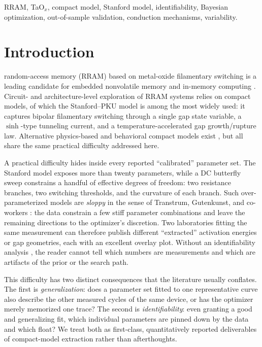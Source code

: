 \documentclass[journal]{IEEEtran}
\begin{document}
\begin{IEEEkeywords}
RRAM, TaO$_x$, compact model, Stanford model, identifiability, Bayesian
optimization, out-of-sample validation, conduction mechanisms, variability.
\end{IEEEkeywords}

\IEEEpeerreviewmaketitle

\section{Introduction}

 random-access memory (RRAM) based on metal-oxide
filamentary switching is a leading candidate for embedded nonvolatile memory
and in-memory computing \cite{wong2012metal,ielmini2018inmemory,yu2018neuro}.
Circuit- and architecture-level exploration of RRAM systems relies on
compact models, of which the Stanford--PKU model
\cite{guan2012spice,jiang2016verification} is among the most widely used: it
captures bipolar filamentary switching through a single gap state variable, a
$\sinh$-type tunneling current, and a temperature-accelerated gap
growth/rupture law.  Alternative physics-based and behavioral compact models
exist \cite{bocquet2014,bengel2020jart,kvatinsky2015vteam}, but all share the
same practical difficulty addressed here.

A practical difficulty hides inside every reported ``calibrated'' parameter
set.  The Stanford model exposes more than twenty parameters, while a DC
butterfly sweep constrains a handful of effective degrees of freedom: two
resistance branches, two switching thresholds, and the curvature of each
branch.  Such over-parameterized models are \emph{sloppy} in the sense of
Transtrum, Gutenkunst, and co-workers
\cite{transtrum2015sloppiness,gutenkunst2007}: the data constrain a few stiff
parameter combinations and leave the remaining directions to the optimizer's
discretion.  Two laboratories fitting the same measurement can therefore
publish different ``extracted'' activation energies or gap geometries, each
with an excellent overlay plot.  Without an identifiability analysis
\cite{raue2009,chis2011}, the reader cannot tell which numbers are
measurements and which are artifacts of the prior or the search path.

This difficulty has two distinct consequences that the literature usually
conflates.  The first is \emph{generalization}: does a parameter set fitted to
one representative curve also describe the other measured cycles of the same
device, or has the optimizer merely memorized one trace?  The second is
\emph{identifiability}: even granting a good and generalizing fit, which
individual parameters are pinned down by the data and which float?  We treat
both as first-class, quantitatively reported deliverables of compact-model
extraction rather than afterthoughts.
\end{document}
